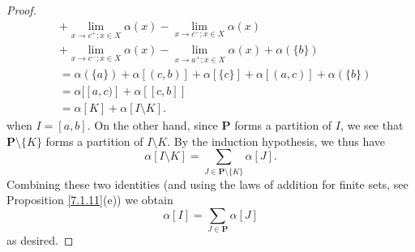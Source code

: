 \begin{proof}
\begin{align*}
                  & + \lim_{x \to c^+ ; x \in X} \alpha(x) - \lim_{x \to c^- ; x \in X} \alpha(x)                                 \\
                  & + \lim_{x \to c^- ; x \in X} \alpha(x) - \lim_{x \to a^+ ; x \in X} \alpha(x) + \alpha(\{b\})                 \\
                  & = \alpha(\{a\}) + \alpha[(c, b)] + \alpha[\{c\}] + \alpha[(a, c)] + \alpha(\{b\})                             \\
                  & = \alpha[[a, c)] + \alpha[[c, b]]                                                                             \\
                  & = \alpha[K] + \alpha[I \setminus K].
    \end{align*}
    when \(I = [a, b]\).
    On the other hand, since \(\mathbf{P}\) forms a partition of \(I\), we see that \(\mathbf{P} \setminus \{K\}\) forms a partition of \(I \setminus K\).
    By the induction hypothesis, we thus have
    \[
        \alpha[I \setminus K] = \sum_{J \in \mathbf{P} \setminus \{K\}} \alpha[J].
    \]
    Combining these two identities (and using the laws of addition for finite sets, see Proposition \ref{7.1.11}(e)) we obtain
    \[
        \alpha[I] = \sum_{J \in \mathbf{P}} \alpha[J]
    \]
    as desired.


\end{proof}
